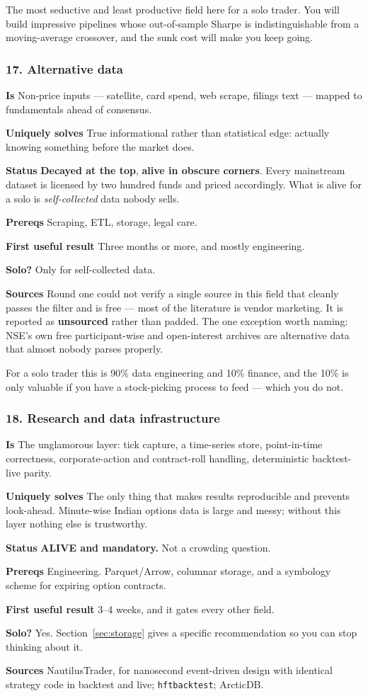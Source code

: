 \documentclass[11pt,a4paper]{article}
\newcommand{\alv}[1]{\textcolor{alive}{\textbf{#1}}}
\newcommand{\dec}[1]{\textcolor{decayed}{\textbf{#1}}}
\newcommand{\fitem}[1]{\par\smallskip\noindent\textbf{#1} }
\begin{document}
\begin{waste}
The most seductive and least productive field here for a solo trader. You will
build impressive pipelines whose out-of-sample Sharpe is indistinguishable from a
moving-average crossover, and the sunk cost will make you keep going.
\end{waste}

\subsubsection{17. Alternative data}
\fitem{Is}Non-price inputs --- satellite, card spend, web scrape, filings text
--- mapped to fundamentals ahead of consensus.
\fitem{Uniquely solves}True informational rather than statistical edge: actually
knowing something before the market does.
\fitem{Status}\dec{Decayed at the top}, \alv{alive in obscure corners}. Every
mainstream dataset is licensed by two hundred funds and priced accordingly. What
is alive for a solo is \emph{self-collected} data nobody sells.
\fitem{Prereqs}Scraping, ETL, storage, legal care.
\fitem{First useful result}Three months or more, and mostly engineering.
\fitem{Solo?}Only for self-collected data.
\fitem{Sources}Round one could not verify a single source in this field that
cleanly passes the filter and is free --- most of the literature is vendor
marketing. It is reported as \textbf{unsourced} rather than padded. The one
exception worth naming: NSE's own free participant-wise and open-interest
archives are alternative data that almost nobody parses properly.

\begin{waste}
For a solo trader this is 90\% data engineering and 10\% finance, and the 10\% is
only valuable if you have a stock-picking process to feed --- which you do not.
\end{waste}

\subsubsection{18. Research and data infrastructure}
\fitem{Is}The unglamorous layer: tick capture, a time-series store, point-in-time
correctness, corporate-action and contract-roll handling, deterministic
backtest-live parity.
\fitem{Uniquely solves}The only thing that makes results reproducible and
prevents look-ahead. Minute-wise Indian options data is large and messy; without
this layer nothing else is trustworthy.
\fitem{Status}\alv{ALIVE and mandatory.} Not a crowding question.
\fitem{Prereqs}Engineering. Parquet/Arrow, columnar storage, and a symbology
scheme for expiring option contracts.
\fitem{First useful result}3--4 weeks, and it gates every other field.
\fitem{Solo?}Yes. Section~\ref{sec:storage} gives a specific recommendation so
you can stop thinking about it.
\fitem{Sources}NautilusTrader, for nanosecond event-driven design with identical
strategy code in backtest and live; \texttt{hftbacktest}; ArcticDB.
\end{document}
